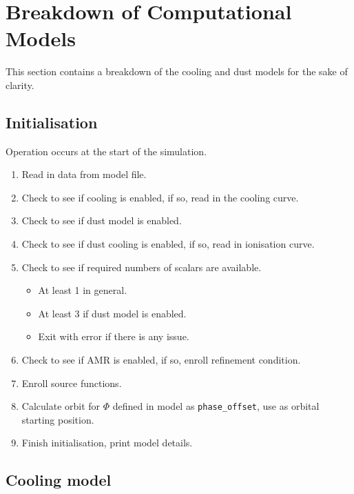 
\chapter{Breakdown of Computational Models}

This section contains a breakdown of the cooling and dust models for the sake of clarity.

\section{Initialisation}

Operation occurs at the start of the simulation.

\begin{enumerate}
  \item Read in data from model file.
  \item Check to see if cooling is enabled, if so, read in the cooling curve.
  \item Check to see if dust model is enabled.
  \item Check to see if dust cooling is enabled, if so, read in ionisation curve.
  \item Check to see if required numbers of scalars are available.
  \begin{itemize}
    \item At least 1 in general.
    \item At least 3 if dust model is enabled.
    \item Exit with error if there is any issue.
  \end{itemize}
  \item Check to see if AMR is enabled, if so, enroll refinement condition.
  \item Enroll source functions.
  \item Calculate orbit for $\Phi$ defined in model as \texttt{phase\_offset}, use as orbital starting position.
  \item Finish initialisation, print model details.
\end{enumerate}

\section{Cooling model}

